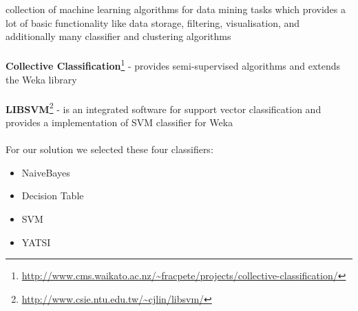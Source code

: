 collection of machine learning algorithms for data mining tasks which provides a lot of basic functionality like data storage, filtering, visualisation, and additionally many classifier and clustering algorithms \\
\\
\textbf{Collective Classification}\footnote{\url{http://www.cms.waikato.ac.nz/~fracpete/projects/collective-classification/}} - 
provides semi-supervised algorithms and extends the Weka library \\
\\
\textbf{LIBSVM}\footnote{\url{http://www.csie.ntu.edu.tw/~cjlin/libsvm/}} - 
is an integrated software for support vector classification and provides a implementation of SVM classifier for Weka \\
\\
For our solution we selected these four classifiers:
\begin{itemize}
	\item[\textbullet] NaiveBayes
	\item[\textbullet] Decision Table
	\item[\textbullet] SVM
	\item[\textbullet] YATSI
\end{itemize}